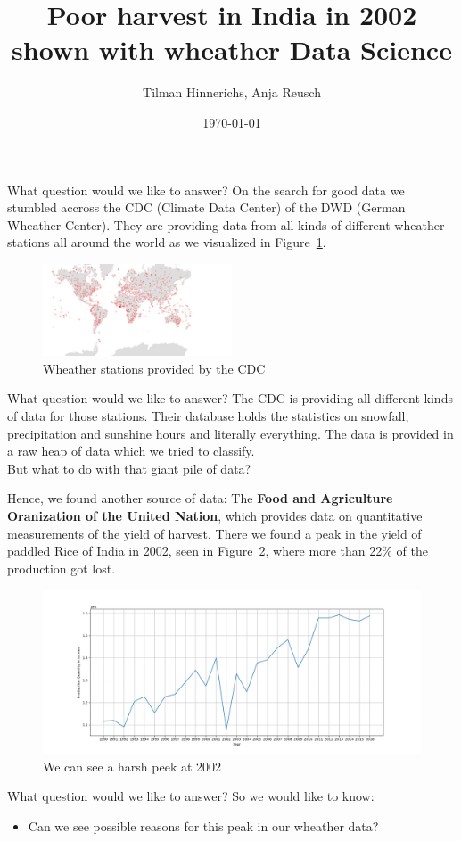 \documentclass[10pt]{beamer}
\title{Poor harvest in India in 2002 shown with wheather Data Science}
\author{Tilman Hinnerichs, Anja Reusch}
\institute{Bertelsmann Data Science Scholarship Program}
\date{\today}
\begin{document}
\begin{frame}
	\titlepage
\end{frame}

\begin{frame}{What question would we like to answer?}
	On the search for good data we stumbled accross the CDC (Climate Data Center) of the DWD (German Wheather Center). They are providing data from all kinds of different wheather stations all around the world as we visualized in Figure~\ref{Stations}.
	\begin{figure}[ht]
		\centering
		\includegraphics[width = 0.5\textwidth]{WheatherStations.jpeg}
		\caption{Wheather stations provided by the CDC}
		\label{Stations}
	\end{figure}
\end{frame}	

\begin{frame}{What question would we like to answer?}
	The CDC is providing all different kinds of data for those stations. Their database holds the statistics on snowfall, precipitation and sunshine hours and literally everything. The data is provided in a raw heap of data which we tried to classify.\\\vfill
	\large But what to do with that giant pile of data?
\end{frame}

\begin{frame}
	Hence, we found another source of data: The \textbf{Food and Agriculture Oranization of the United Nation}, which provides data on quantitative measurements of the yield of harvest. There we found a peak in the yield of paddled Rice of India in 2002, seen in Figure~\ref{IndiaRice}, where more than 22\% of the production got lost.
	\begin{figure}
		\includegraphics[width=1\textwidth]{IndiaRiceQuantity.png}
		\caption{We can see a harsh peek at 2002}
		\label{IndiaRice}
	\end{figure}
\end{frame}

\begin{frame}{What question would we like to answer?}
	So we would like to know: \\
	\begin{itemize}
		\item \large Can we see possible reasons for this peak in our wheather data?
	\end{itemize}
	
\end{frame}
\end{document}
